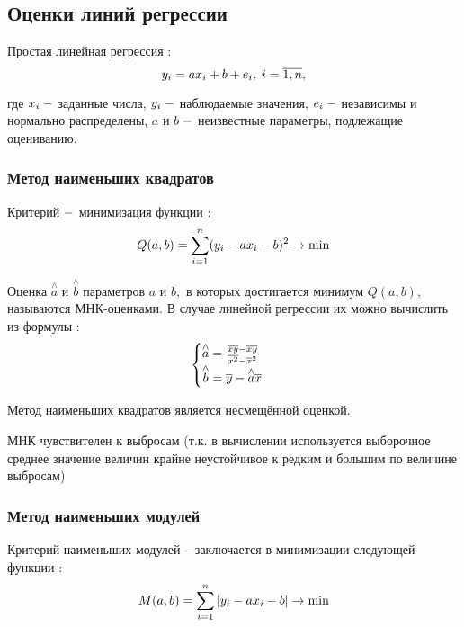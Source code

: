 \documentclass[a4]{article}
\begin{document}
\subsection{Оценки линий регрессии}
Простая линейная регрессия \cite{lin_reg}:
\begin{equation}
    y_i=ax_i+b+e_i,\;i=\overline{1,n},\hfill
\end{equation}

где $x_i\;\--$ заданные числа, $y_i\;\--$ наблюдаемые значения, $e_i\;\--$ независимы и нормально распределены, $a$ и $b\;\--$ неизвестные параметры, подлежащие оцениванию.

\subsubsection{Метод наименьших квадратов}

Критерий $\--$ минимизация функции \cite{MNK}:
\begin{equation}
    Q(a,b)=\sum\limits_{i=1}^n(y_i-ax_i-b)^2\to \min\hfill
\end{equation}

Оценка $\overset{\wedge}{a}$ и $\overset{\wedge}{b}$ параметров $a$ и $b,$ в которых достигается минимум $Q(a,b),$ называются МНК-оценками. В случае линейной регрессии их можно вычислить из формулы \cite{6_3}:
\begin{equation}
    \begin{cases}
    \overset{\wedge}{a} = \frac{\overline{x y}-\overline{x}\overline{y}}{\overline{x^2}-\overline{x}^2}\\
    \overset{\wedge}{b} = \overline{y}-\overset{\wedge}{a}\overline{x}
    \end{cases}\hfill
\end{equation}

Метод наименьших квадратов является несмещённой оценкой.

МНК чувствителен к выбросам (т.к. в вычислении используется выборочное среднее значение величин крайне неустойчивое к редким и большим по величине выбросам)

\subsubsection{Метод наименьших модулей}
Критерий наименьших модулей – заключается в минимизации следующей функции \cite{6_4}:
\begin{equation}
    M(a,b) = \sum\limits_{i=1}^n\vert y_i-ax_i-b\vert\to\min\hfill
\end{equation}
\end{document}
